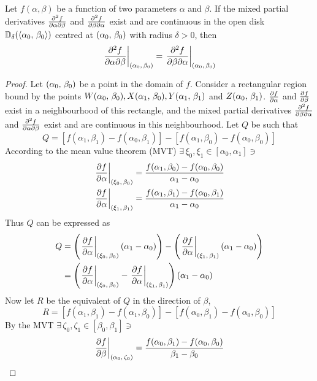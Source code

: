 \begin{lemma}
	Let $f(\alpha,\beta)$ be a function of two parameters $\alpha$ and $\beta$. If the mixed partial derivatives $\pdv{f}{\alpha}{\beta}$
	and $\pdv{f}{\beta}{\alpha}$ exist and are continuous in the open disk $\mathbb{D}_\delta(\langle\alpha_0,\,\beta_0\rangle)$ centred at
	$(\alpha_0,\,\beta_0)$ with radius $\delta>0$, then
	$$
		\eval{\pdv{f}{\alpha}{\beta}}_{\point{\alpha_0}{\beta_0}}=\eval{\pdv{f}{\beta}{\alpha}}_{\point{\alpha_0}{\beta_0}}
	$$
	\cite{GARRETT2015377}
	\begin{proof}
		Let $(\alpha_0,\,\beta_0)$ be a point in the domain of $f$. Consider a rectangular region bound by the
		points $W(\alpha_0,\,\beta_0),X(\alpha_1,\,\beta_0), Y(\alpha_1,\,\beta_1)$  and $Z(\alpha_0,\,\beta_1)$. 
		$\pdv{f}{\alpha}$ and $\pdv{f}{\beta}$ exist in a neighbourhood of this rectangle, and the mixed partial derivatives 
		$\pdv{f}{\beta}{\alpha}$ and $\pdv{f}{\alpha}{\beta}$ exist and are continuous in this neighbourhood. Let $Q$ be such that
		$$
		Q=[f(\alpha_1,\beta_1)-f(\alpha_0,\beta_1)]-[f(\alpha_1,\beta_0)-f(\alpha_0,\beta_0)]
		$$
		According to the mean value theorem (MVT) $\exists\,\xi_0,\xi_1\in[\alpha_0,\alpha_1]\ni$
		\begin{align*}
			\eval{\pdv{f}{\alpha}}_{\point{\xi_0}{\beta_0}}&=\frac{f(\alpha_1,\beta_0)-f(\alpha_0,\beta_0)}{\alpha_1-\alpha_0}\\
			\eval{\pdv{f}{\alpha}}_{\point{\xi_1}{\beta_1}}&=\frac{f(\alpha_1,\beta_1)-f(\alpha_0,\beta_1)}{\alpha_1-\alpha_0}
		\end{align*}
		Thus $Q$ can be expressed as
		\begin{align*}
			Q&=\left(\eval{\pdv{f}{\alpha}}_{\point{\xi_0}{\beta_0}}\left(\alpha_1-\alpha_0\right)\right)-\left(\eval{\pdv{f}{\alpha}}_{\point{\xi_1}{\beta_1}}\left(\alpha_1-\alpha_0\right)\right)\\
			&=\left(\eval{\pdv{f}{\alpha}}_{\point{\xi_0}{\beta_0}}-\eval{\pdv{f}{\alpha}}_{\point{\xi_1}{\beta_1}}\right)\left(\alpha_1-\alpha_0\right)
		\end{align*}
		Now let $R$ be the equivalent of $Q$ in the direction of $\beta$,
		$$
			R=[f(\alpha_1,\beta_1)-f(\alpha_1,\beta_0)]-[f(\alpha_0,\beta_1)-f(\alpha_0,\beta_0)]
		$$
		By the MVT $\exists\,\zeta_0,\zeta_1\in[\beta_0,\beta_1]\ni$
		\begin{align*}
			\eval{\pdv{f}{\beta}}_{\point{\alpha_0}{\zeta_0}}&=\frac{f(\alpha_0,\beta_1)-f(\alpha_0,\beta_0)}{\beta_1-\beta_0}\\

\end{align*}
\end{proof}
\end{lemma}
